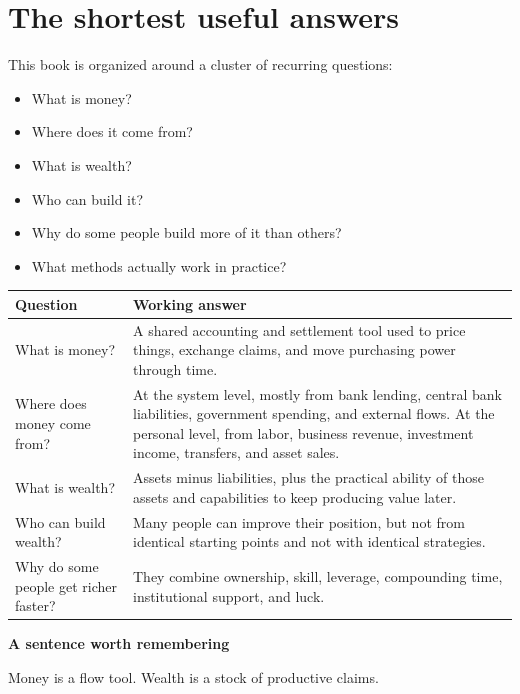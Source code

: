 \documentclass[11pt,openany]{book}
\begin{document}
\chapter{The shortest useful answers}

This book is organized around a cluster of recurring questions:

\begin{itemize}
  \item What is money?
  \item Where does it come from?
  \item What is wealth?
  \item Who can build it?
  \item Why do some people build more of it than others?
  \item What methods actually work in practice?
\end{itemize}

\begin{center}
\begin{tabularx}{\textwidth}{>{\raggedright\arraybackslash}p{}X}
\toprule
\textbf{Question} & \textbf{Working answer} \\
\midrule
What is money? & A shared accounting and settlement tool used to price things, exchange claims, and move purchasing power through time. \\
Where does money come from? & At the system level, mostly from bank lending, central bank liabilities, government spending, and external flows. At the personal level, from labor, business revenue, investment income, transfers, and asset sales. \\
What is wealth? & Assets minus liabilities, plus the practical ability of those assets and capabilities to keep producing value later. \\
Who can build wealth? & Many people can improve their position, but not from identical starting points and not with identical strategies. \\
Why do some people get richer faster? & They combine ownership, skill, leverage, compounding time, institutional support, and luck. \\
\bottomrule
\end{tabularx}
\end{center}

\begin{signalbox}
\textbf{A sentence worth remembering}\par
Money is a flow tool. Wealth is a stock of productive claims.
\end{signalbox}
\end{document}
